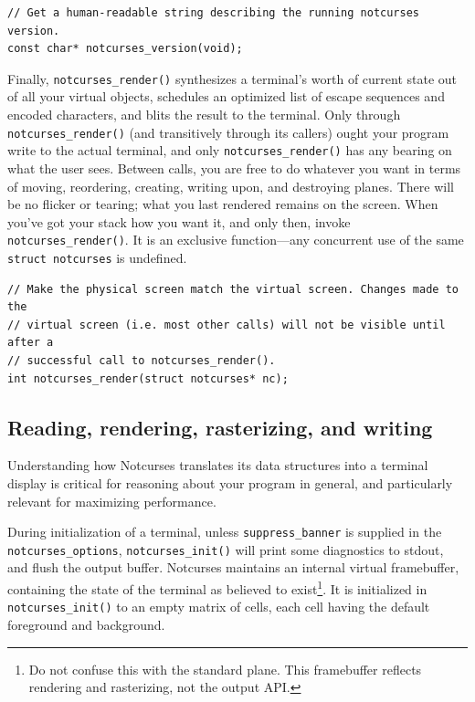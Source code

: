 \documentclass[letterpaper,10pt]{article}
\begin{document}
\begin{listing}[!htbp]
\begin{verbatim}
// Get a human-readable string describing the running notcurses version.
const char* notcurses_version(void);
\end{verbatim}
\end{listing}

Finally, \texttt{notcurses\_render()} synthesizes a terminal's worth of current
state out of all your virtual objects, schedules an optimized list of escape
sequences and encoded characters, and blits the result to the terminal. Only
through \texttt{notcurses\_render()} (and transitively through its callers) ought
your program write to the actual terminal, and only \texttt{notcurses\_render()}
has any bearing on what the user sees. Between calls, you are free to do whatever
you want in terms of moving, reordering, creating, writing upon, and destroying
planes. There will be no flicker or tearing; what you last rendered remains on
the screen. When you've got your stack how you want it, and only then, invoke
\texttt{notcurses\_render()}. It is an exclusive function---any concurrent use
of the same \texttt{struct notcurses} is undefined.

\begin{listing}[!htbp]
\begin{verbatim}
// Make the physical screen match the virtual screen. Changes made to the
// virtual screen (i.e. most other calls) will not be visible until after a
// successful call to notcurses_render().
int notcurses_render(struct notcurses* nc);
\end{verbatim}
\end{listing}

\subsection{Reading, rendering, rasterizing, and writing}

Understanding how Notcurses translates its data structures into a terminal
display is critical for reasoning about your program in general, and particularly
relevant for maximizing performance.

During initialization of a terminal, unless \texttt{suppress\_banner} is supplied
in the \texttt{notcurses\_options}, \texttt{notcurses\_init()} will print some
diagnostics to stdout, and flush the output buffer. Notcurses maintains an
internal virtual framebuffer, containing the state of the terminal as believed
to exist\footnote{Do not confuse this with the standard plane. This framebuffer
reflects rendering and rasterizing, not the output API.}. It is initialized in
\texttt{notcurses\_init()} to an empty matrix of cells, each cell having the
default foreground and background.
\end{document}
